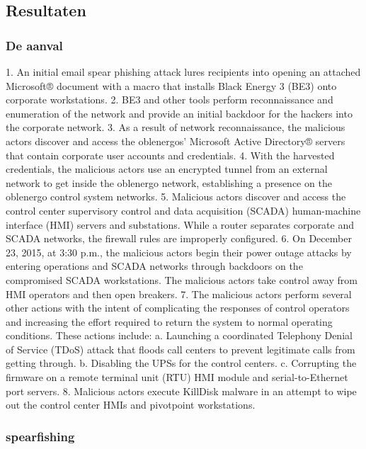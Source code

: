 \subsection{Resultaten}
\subsubsection{De aanval}
1. An initial email spear phishing attack lures recipients
into opening an attached Microsoft® document with a
macro that installs Black Energy 3 (BE3) onto
corporate workstations.
2. BE3 and other tools perform reconnaissance and
enumeration of the network and provide an initial
backdoor for the hackers into the corporate network.
3. As a result of network reconnaissance, the malicious
actors discover and access the oblenergos’ Microsoft
Active Directory® servers that contain corporate user
accounts and credentials.
4. With the harvested credentials, the malicious actors use
an encrypted tunnel from an external network to get
inside the oblenergo network, establishing a presence
on the oblenergo control system networks.
5. Malicious actors discover and access the control center
supervisory control and data acquisition (SCADA)
human-machine interface (HMI) servers and
substations. While a router separates corporate and
SCADA networks, the firewall rules are improperly
configured.
6. On December 23, 2015, at 3:30 p.m., the malicious
actors begin their power outage attacks by entering
operations and SCADA networks through backdoors on
the compromised SCADA workstations. The malicious
actors take control away from HMI operators and then
open breakers.
7. The malicious actors perform several other actions with
the intent of complicating the responses of control
operators and increasing the effort required to return the
system to normal operating conditions. These actions
include:
a. Launching a coordinated Telephony Denial of
Service (TDoS) attack that floods call centers to
prevent legitimate calls from getting through.
b. Disabling the UPSs for the control centers.
c. Corrupting the firmware on a remote terminal unit
(RTU) HMI module and serial-to-Ethernet port
servers.
8. Malicious actors execute KillDisk malware in an
attempt to wipe out the control center HMIs and pivotpoint workstations.

\cite{Whitehead2017ukrainepoweroutage}

\cite{boozallen2016lightwentout}
\subsubsection{spearfishing}
